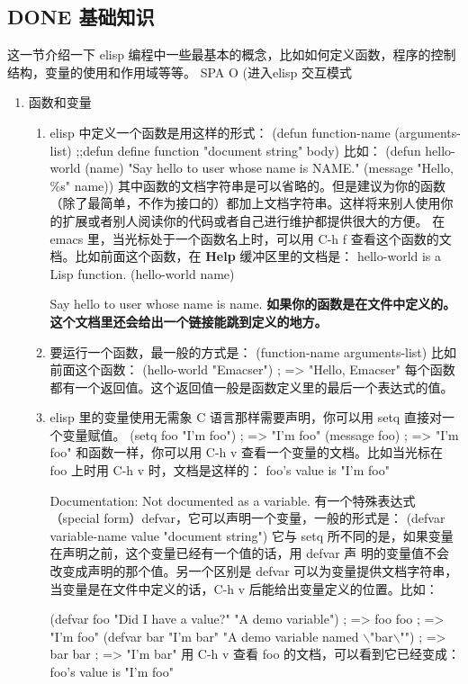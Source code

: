 \documentclass[11pt]{ctexart}
\begin{document}
\subsection{{\bfseries\sffamily DONE} 基础知识}
\label{sec:org5e0640a}
这一节介绍一下 elisp 编程中一些最基本的概念，比如如何定义函数，程序的控制结构，变量的使用和作用域等等。
SPA O (进入elisp 交互模式
\begin{enumerate}
\item 函数和变量
\label{sec:org1567417}
\begin{enumerate}
\item elisp 中定义一个函数是用这样的形式：
\label{sec:org92f780e}
(defun function-name (arguments-list) ;;defun define function
"document string"
body)
比如：
(defun hello-world (name)
"Say hello to user whose name is NAME."
(message "Hello, \%s" name))
其中函数的文档字符串是可以省略的。但是建议为你的函数（除了最简单，不作为接口的）都加上文档字符串。这样将来别人使用你的扩展或者别人阅读你的代码或者自己进行维护都提供很大的方便。
在 emacs 里，当光标处于一个函数名上时，可以用 C-h f 查看这个函数的文档。比如前面这个函数，在 \textbf{Help} 缓冲区里的文档是：
hello-world is a Lisp function.
(hello-world name)

Say hello to user whose name is name.
\textbf{如果你的函数是在文件中定义的。这个文档里还会给出一个链接能跳到定义的地方。}

\item 要运行一个函数，最一般的方式是：
\label{sec:org98d4d4e}
(function-name arguments-list)
比如前面这个函数：
(hello-world "Emacser")                 ; => "Hello, Emacser"
每个函数都有一个返回值。这个返回值一般是函数定义里的最后一个表达式的值。

\item elisp 里的变量使用无需象 C 语言那样需要声明，你可以用 setq 直接对一个变量赋值。
\label{sec:orgb2d5a49}
(setq foo "I'm foo")                    ; => "I'm foo"
(message foo)                           ; => "I'm foo"
和函数一样，你可以用 C-h v 查看一个变量的文档。比如当光标在 foo 上时用 C-h v 时，文档是这样的：
foo's value is "I'm foo"

Documentation:
Not documented as a variable.
有一个特殊表达式（special form）defvar，它可以声明一个变量，一般的形式是：
(defvar variable-name value
"document string")
它与 setq 所不同的是，如果变量在声明之前，这个变量已经有一个值的话，用 defvar 声
明的变量值不会改变成声明的那个值。另一个区别是 defvar 可以为变量提供文档字符串，
当变量是在文件中定义的话，C-h v 后能给出变量定义的位置。比如：

(defvar foo "Did I have a value?"
"A demo variable")                    ; => foo
foo                                     ; => "I'm foo"
(defvar bar "I'm bar"
"A demo variable named $\backslash$"bar$\backslash$"")      ; => bar
bar                                     ; => "I'm bar"
用 C-h v 查看 foo 的文档，可以看到它已经变成：
foo's value is "I'm foo"


\end{enumerate}
\end{enumerate}
\end{document}

